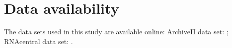 
\section*{Data availability}

\small

The data sets used in this study are available online:
ArchiveII data set: \url{};
RNAcentral data set: \url{}.
